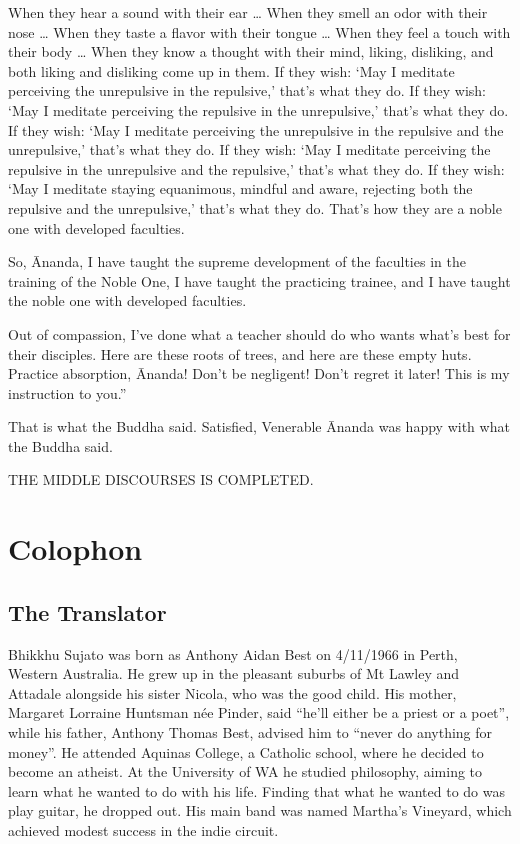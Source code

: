 \documentclass[12pt,openany]{book}%
\newcommand*{\scendbook}[1]{\begin{center}\uppercase{#1}\end{center}}
\let\oldbackmatter\backmatter
\renewcommand{\backmatter}{%
\chapterfont{\setstretch{.85}\normalfont\centering}%
\sectionfont{\setstretch{.85}\Semiboldsubheadfont}%
\oldbackmatter}
\begin{document}
When they hear a sound with their ear … When they smell an odor with their nose … When they taste a flavor with their tongue … When they feel a touch with their body … When they know a thought with their mind, liking, disliking, and both liking and disliking come up in them. If they wish: ‘May I meditate perceiving the unrepulsive in the repulsive,’ that’s what they do. If they wish: ‘May I meditate perceiving the repulsive in the unrepulsive,’ that’s what they do. If they wish: ‘May I meditate perceiving the unrepulsive in the repulsive and the unrepulsive,’ that’s what they do. If they wish: ‘May I meditate perceiving the repulsive in the unrepulsive and the repulsive,’ that’s what they do. If they wish: ‘May I meditate staying equanimous, mindful and aware, rejecting both the repulsive and the unrepulsive,’ that’s what they do. That’s how they are a noble one with developed faculties. 

So, Ānanda, I have taught the supreme development of the faculties in the training of the Noble One, I have taught the practicing trainee, and I have taught the noble one with developed faculties. 

Out of compassion, I’ve done what a teacher should do who wants what’s best for their disciples. Here are these roots of trees, and here are these empty huts. Practice absorption, Ānanda! Don’t be negligent! Don’t regret it later! This is my instruction to you.” 

That is what the Buddha said. Satisfied, Venerable Ānanda was happy with what the Buddha said. 

\scendbook{The Middle Discourses is completed. }

%
\backmatter%
\chapter*{Colophon}

\section*{The Translator}

Bhikkhu Sujato was born as Anthony Aidan Best on 4/11/1966 in Perth, Western Australia. He grew up in the pleasant suburbs of Mt Lawley and Attadale alongside his sister Nicola, who was the good child. His mother, Margaret Lorraine Huntsman née Pinder, said “he’ll either be a priest or a poet”, while his father, Anthony Thomas Best, advised him to “never do anything for money”. He attended Aquinas College, a Catholic school, where he decided to become an atheist. At the University of WA he studied philosophy, aiming to learn what he wanted to do with his life. Finding that what he wanted to do was play guitar, he dropped out. His main band was named Martha’s Vineyard, which achieved modest success in the indie circuit. 
\end{document}
